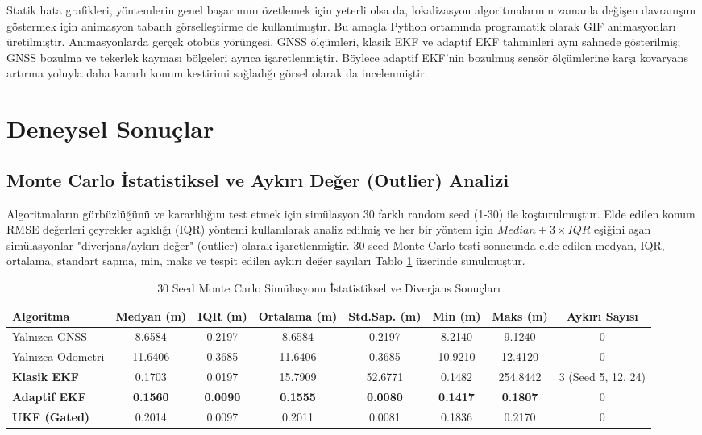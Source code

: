 ﻿\documentclass[conference]{IEEEtran}
\begin{document}
Statik hata grafikleri, yöntemlerin genel başarımını özetlemek için yeterli olsa da, lokalizasyon algoritmalarının zamanla değişen davranışını göstermek için animasyon tabanlı görselleştirme de kullanılmıştır. Bu amaçla Python ortamında programatik olarak GIF animasyonları üretilmiştir. Animasyonlarda gerçek otobüs yörüngesi, GNSS ölçümleri, klasik EKF ve adaptif EKF tahminleri aynı sahnede gösterilmiş; GNSS bozulma ve tekerlek kayması bölgeleri ayrıca işaretlenmiştir. Böylece adaptif EKF’nin bozulmuş sensör ölçümlerine karşı kovaryans artırma yoluyla daha kararlı konum kestirimi sağladığı görsel olarak da incelenmiştir.

\section{Deneysel Sonuçlar}
\subsection{Monte Carlo İstatistiksel ve Aykırı Değer (Outlier) Analizi}
Algoritmaların gürbüzlüğünü ve kararlılığını test etmek için simülasyon 30 farklı random seed (1-30) ile koşturulmuştur. Elde edilen konum RMSE değerleri çeyrekler açıklığı (IQR) yöntemi kullanılarak analiz edilmiş ve her bir yöntem için $Median + 3 \times IQR$ eşiğini aşan simülasyonlar "diverjans/aykırı değer" (outlier) olarak işaretlenmiştir. 30 seed Monte Carlo testi sonucunda elde edilen medyan, IQR, ortalama, standart sapma, min, maks ve tespit edilen aykırı değer sayıları Tablo \ref{tab:monte_carlo} üzerinde sunulmuştur.

\begin{table}[htbp]
\caption{30 Seed Monte Carlo Simülasyonu İstatistiksel ve Diverjans Sonuçları}
\label{tab:monte_carlo}
\centering
\footnotesize
\begin{tabular}{lccccccc}
\toprule
\textbf{Algoritma} & \textbf{Medyan (m)} & \textbf{IQR (m)} & \textbf{Ortalama (m)} & \textbf{Std.Sap. (m)} & \textbf{Min (m)} & \textbf{Maks (m)} & \textbf{Aykırı Sayısı} \\
\midrule
Yalnızca GNSS & 8.6584 & 0.2197 & 8.6584 & 0.2197 & 8.2140 & 9.1240 & 0 \\
Yalnızca Odometri & 11.6406 & 0.3685 & 11.6406 & 0.3685 & 10.9210 & 12.4120 & 0 \\
\midrule
\textbf{Klasik EKF} & 0.1703 & 0.0197 & 15.7909 & 52.6771 & 0.1482 & 254.8442 & 3 (Seed 5, 12, 24) \\
\textbf{Adaptif EKF} & \textbf{0.1560} & \textbf{0.0090} & \textbf{0.1555} & \textbf{0.0080} & \textbf{0.1417} & \textbf{0.1807} & 0 \\
\textbf{UKF (Gated)} & 0.2014 & 0.0097 & 0.2011 & 0.0081 & 0.1836 & 0.2170 & 0 \\
\bottomrule
\end{tabular}
\end{table}
\end{document}
